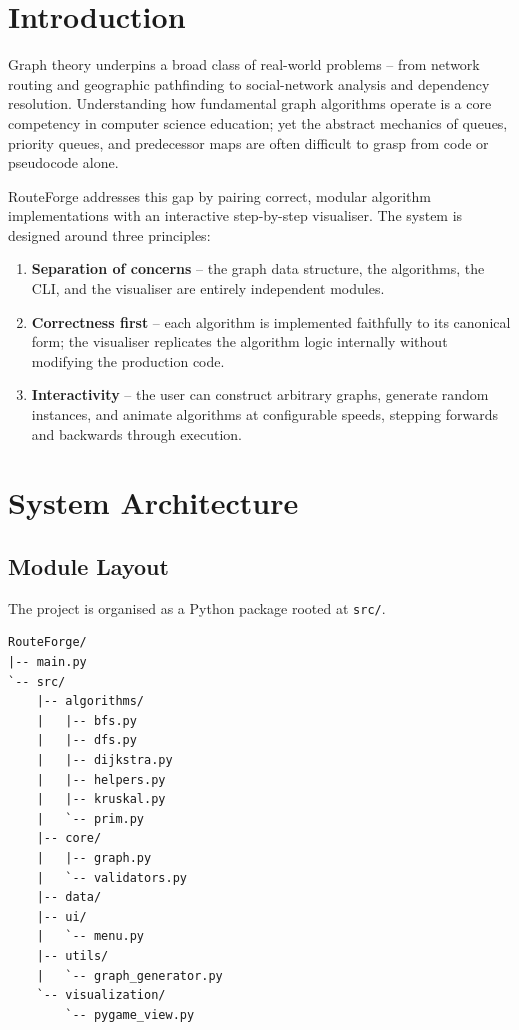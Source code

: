 \documentclass[12pt, a4paper]{article}
\begin{document}
\section{Introduction}

Graph theory underpins a broad class of real-world problems -- from network
routing and geographic pathfinding to social-network analysis and dependency
resolution. Understanding how fundamental graph algorithms operate is a core
competency in computer science education; yet the abstract mechanics of
queues, priority queues, and predecessor maps are often difficult to grasp
from code or pseudocode alone.

RouteForge addresses this gap by pairing correct, modular algorithm
implementations with an interactive step-by-step visualiser. The system is
designed around three principles:

\begin{enumerate}[label=(\roman*)]
    \item \textbf{Separation of concerns} -- the graph data structure, the
          algorithms, the CLI, and the visualiser are entirely independent
          modules.
    \item \textbf{Correctness first} -- each algorithm is implemented
          faithfully to its canonical form; the visualiser replicates the
          algorithm logic internally without modifying the production code.
    \item \textbf{Interactivity} -- the user can construct arbitrary graphs,
          generate random instances, and animate algorithms at configurable
          speeds, stepping forwards and backwards through execution.
\end{enumerate}

\section{System Architecture}
\label{sec:arch}

\subsection{Module Layout}

The project is organised as a Python package rooted at \texttt{src/}.

\begin{verbatim}
RouteForge/
|-- main.py
`-- src/
    |-- algorithms/
    |   |-- bfs.py
    |   |-- dfs.py
    |   |-- dijkstra.py
    |   |-- helpers.py
    |   |-- kruskal.py
    |   `-- prim.py
    |-- core/
    |   |-- graph.py
    |   `-- validators.py
    |-- data/
    |-- ui/
    |   `-- menu.py
    |-- utils/
    |   `-- graph_generator.py
    `-- visualization/
        `-- pygame_view.py
\end{verbatim}
\end{document}
